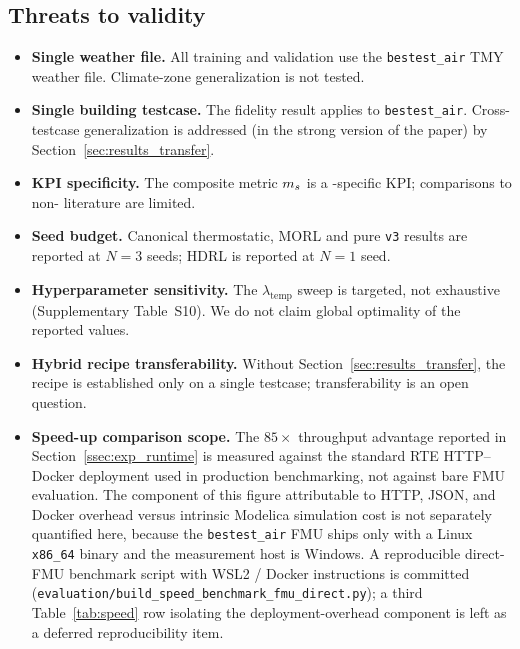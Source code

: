 \subsection{Threats to validity}
\label{ssec:dis_threats}

\begin{itemize}
    \item \textbf{Single weather file.} All training and validation use the
    \boptest{} \texttt{bestest\_air} TMY weather file. Climate-zone
    generalization is not tested.
    \item \textbf{Single building testcase.} The fidelity result applies to
    \texttt{bestest\_air}. Cross-testcase generalization is addressed (in
    the strong version of the paper) by Section~\ref{sec:results_transfer}.
    \item \textbf{KPI specificity.} The composite metric $m_s$ is a
    \boptest{}-specific KPI; comparisons to non-\boptest{} literature are
    limited.
    \item \textbf{Seed budget.} Canonical thermostatic, MORL and pure
    \texttt{v3} results are reported at $N=3$ seeds; HDRL is reported at
    $N=1$ seed.
    \item \textbf{Hyperparameter sensitivity.} The $\lambda_{\mathrm{temp}}$
    sweep is targeted, not exhaustive (Supplementary Table~S10). We do not
    claim global optimality of the reported values.
    \item \textbf{Hybrid recipe transferability.} Without
    Section~\ref{sec:results_transfer}, the recipe is established only on a
    single testcase; transferability is an open question.
    \item \textbf{Speed-up comparison scope.} The $85\times$ throughput
    advantage reported in Section~\ref{ssec:exp_runtime} is measured
    against the standard \boptest{} RTE HTTP--Docker deployment used in
    production benchmarking, not against bare FMU evaluation. The
    component of this figure attributable to HTTP, JSON, and Docker
    overhead versus intrinsic Modelica simulation cost is not separately
    quantified here, because the \boptest{} \texttt{bestest\_air} FMU
    ships only with a Linux \texttt{x86\_64} binary and the measurement
    host is Windows. A reproducible direct-FMU benchmark script with
    WSL2 / Docker instructions is committed
    (\texttt{evaluation/build\_speed\_benchmark\_fmu\_direct.py}); a
    third Table~\ref{tab:speed} row isolating the deployment-overhead
    component is left as a deferred reproducibility item.
\end{itemize}
